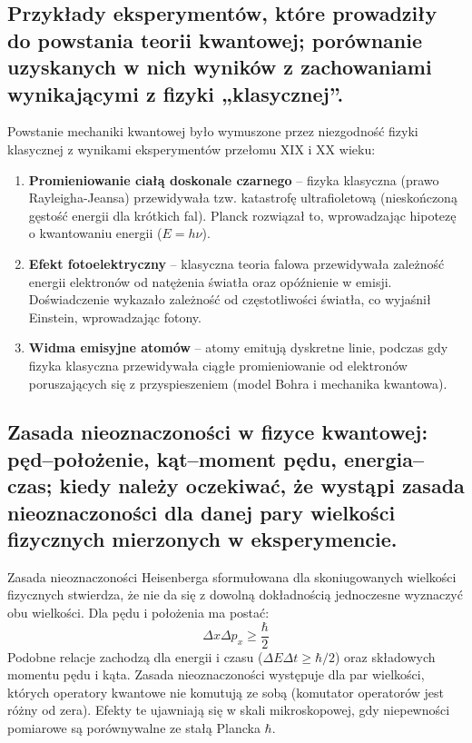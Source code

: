 \documentclass[11pt,a4paper]{article}
\begin{document}
\subsection{Przykłady eksperymentów, które prowadziły do powstania teorii kwantowej; porównanie uzyskanych w nich wyników z zachowaniami wynikającymi z fizyki „klasycznej”.}
Powstanie mechaniki kwantowej było wymuszone przez niezgodność fizyki klasycznej z wynikami eksperymentów przełomu XIX i XX wieku:
\begin{enumerate}
    \item \textbf{Promieniowanie ciałą doskonale czarnego} -- fizyka klasyczna (prawo Rayleigha-Jeansa) przewidywała tzw. katastrofę ultrafioletową (nieskończoną gęstość energii dla krótkich fal). Planck rozwiązał to, wprowadzając hipotezę o kwantowaniu energii ($E = h\nu$).
    \item \textbf{Efekt fotoelektryczny} -- klasyczna teoria falowa przewidywała zależność energii elektronów od natężenia światła oraz opóźnienie w emisji. Doświadczenie wykazało zależność od częstotliwości światła, co wyjaśnił Einstein, wprowadzając fotony.
    \item \textbf{Widma emisyjne atomów} -- atomy emitują dyskretne linie, podczas gdy fizyka klasyczna przewidywała ciągłe promieniowanie od elektronów poruszających się z przyspieszeniem (model Bohra i mechanika kwantowa).
\end{enumerate}

\subsection{Zasada nieoznaczoności w fizyce kwantowej: pęd--położenie, kąt–moment pędu, energia– czas; kiedy należy oczekiwać, że wystąpi zasada nieoznaczoności dla danej pary wielkości fizycznych mierzonych w eksperymencie.}
Zasada nieoznaczoności Heisenberga sformułowana dla skoniugowanych wielkości fizycznych stwierdza, że nie da się z dowolną dokładnością jednoczesne wyznaczyć obu wielkości. Dla pędu i położenia ma postać:
\begin{equation}
\Delta x \Delta p_x \ge \frac{\hbar}{2}
\end{equation}
Podobne relacje zachodzą dla energii i czasu ($\Delta E \Delta t \ge \hbar/2$) oraz składowych momentu pędu i kąta. Zasada nieoznaczoności występuje dla par wielkości, których operatory kwantowe nie komutują ze sobą (komutator operatorów jest różny od zera). Efekty te ujawniają się w skali mikroskopowej, gdy niepewności pomiarowe są porównywalne ze stałą Plancka $\hbar$.
\end{document}
